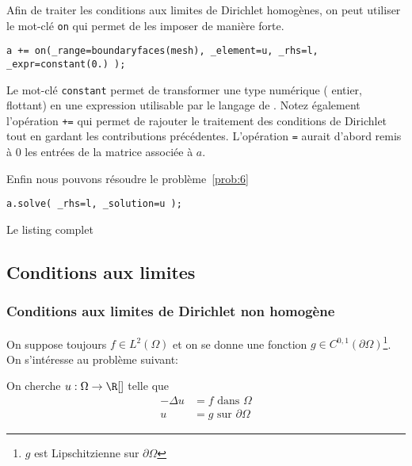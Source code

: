 Afin de traiter les conditions aux limites de Dirichlet homogènes, on peut
utiliser le mot-clé \texttt{on} qui permet de les imposer de manière forte.
\begin{lstlisting}[caption={Traitement des conditions de Dirichlet avec \texttt{on}}]
  a += on(_range=boundaryfaces(mesh), _element=u, _rhs=l, _expr=constant(0.) );
\end{lstlisting}
\begin{remark}
  \label{rem:26}
  Le mot-clé \texttt{constant} permet de transformer une type numérique (\eg
  entier, flottant) en une expression utilisable par le langage de
  \Feel. Notez également l'opération \texttt{+=} qui permet de rajouter le
  traitement des conditions de Dirichlet tout en gardant les contributions
  précédentes. L'opération \texttt{=} aurait d'abord remis à $0$ les entrées
  de la matrice associée à $a$.
\end{remark}

Enfin nous pouvons résoudre le problème~\ref{prob:6}

\begin{lstlisting}[caption={Résolution du problème discret~\ref{prob:6}}]
  a.solve( _rhs=l, _solution=u );
\end{lstlisting}

Le listing complet



\subsection{Conditions aux limites}
\label{sec:cond-aux-limit}

\subsubsection{Conditions aux limites de Dirichlet non homogène}
\label{sec:cond-aux-limit-1}

On suppose toujours $f \in L^2(\Omega)$ et on se donne une fonction $g \in
C^{0,1}(\partial \Omega)$\footnote{$g$ est Lipschitzienne sur $\partial
\Omega$}. On s'intéresse au problème suivant:
\begin{problem}
  \label{prob:7}
  On cherche $u : \Omega \rightarrow \R[]$ telle que
  \begin{equation}
    \label{eq:76}
    \begin{split}
    -\Delta u &= f \mbox{ dans } \Omega\\
    u &= g \mbox{ sur } \partial \Omega
    \end{split}
  \end{equation}
\end{problem}


